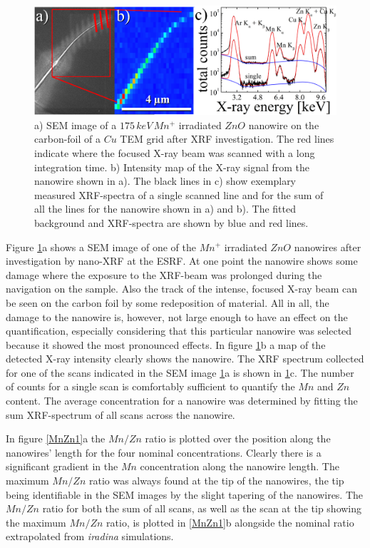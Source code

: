 \begin{figure}[h]
	\centering
		\includegraphics[width=.8\textwidth]{images/XRFSEM.png}
	\caption{a) SEM image of a $175\,keV\,Mn^+$ irradiated $ZnO$ nanowire on the carbon-foil of a $Cu$ TEM grid after XRF investigation. The red lines indicate where the focused X-ray beam was scanned with a long integration time. b) Intensity map of the X-ray signal from the nanowire shown in a). The black lines in c) show exemplary measured XRF-spectra of a single scanned line and for the sum of all the lines for the nanowire shown in a) and b). The fitted background and XRF-spectra are shown by blue and red lines.} 
	\label{XRFSEM}
\end{figure} 


Figure \ref{XRFSEM}a shows a SEM image of one of the $Mn^+$ irradiated $ZnO$ nanowires after investigation by nano-XRF at the ESRF. At one point the nanowire shows some damage where the exposure to the XRF-beam was prolonged during the navigation on the sample. Also the track of the intense, focused X-ray beam can be seen on the carbon foil by some redeposition of material. All in all, the damage to the nanowire is, however, not large enough to have an effect on the quantification, especially considering that this particular nanowire was selected because it showed the most pronounced effects. In figure \ref{XRFSEM}b a map of the detected X-ray intensity clearly shows the nanowire. The XRF spectrum collected for one of the scans indicated in the SEM image \ref{XRFSEM}a is shown in \ref{XRFSEM}c. The number of counts for a single scan is comfortably sufficient to quantify the $Mn$ and $Zn$ content. The average concentration for a nanowire was determined by fitting the sum XRF-spectrum of all scans across the nanowire.

In figure \ref{MnZn1}a the $Mn/Zn$ ratio is plotted over the position along the nanowires' length for the four nominal concentrations. Clearly there is a significant gradient in the $Mn$ concentration along the nanowire length. The maximum $Mn/Zn$ ratio was always found at the tip of the nanowires, the tip being identifiable in the SEM images by the slight tapering of the nanowires. The $Mn/Zn$ ratio for both the sum of all scans, as well as the scan at the tip showing the maximum $Mn/Zn$ ratio, is plotted in \ref{MnZn1}b alongside the nominal ratio extrapolated from \emph{iradina} simulations.

